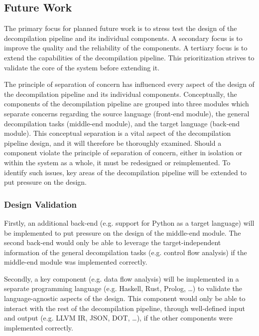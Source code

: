 
\subsection{Future Work}
\label{sec:future_work}

The primary focus for planned future work is to stress test the design of the decompilation pipeline and its individual components. A secondary focus is to improve the quality and the reliability of the components. A tertiary focus is to extend the capabilities of the decompilation pipeline. This prioritization strives to validate the core of the system before extending it.

The principle of separation of concern has influenced every aspect of the design of the decompilation pipeline and its individual components. Conceptually, the components of the decompilation pipeline are grouped into three modules which separate concerns regarding the source language (front-end module), the general decompilation tasks (middle-end module), and the target language (back-end module). This conceptual separation is a vital aspect of the decompilation pipeline design, and it will therefore be thoroughly examined. Should a component violate the principle of separation of concern, either in isolation or within the system as a whole, it must be redesigned or reimplemented. To identify such issues, key areas of the decompilation pipeline will be extended to put pressure on the design.


\subsubsection{Design Validation}
\label{sec:design_validation}


Firstly, an additional back-end (e.g. support for Python as a target language) will be implemented to put pressure on the design of the middle-end module. The second back-end would only be able to leverage the target-independent information of the general decompilation tasks (e.g. control flow analysis) if the middle-end module was implemented correctly.

Secondly, a key component (e.g. data flow analysis) will be implemented in a separate programming language (e.g. Haskell, Rust, Prolog, …) to validate the language-agnostic aspects of the design. This component would only be able to interact with the rest of the decompilation pipeline, through well-defined input and output (e.g. LLVM IR, JSON, DOT, …), if the other components were implemented correctly.

